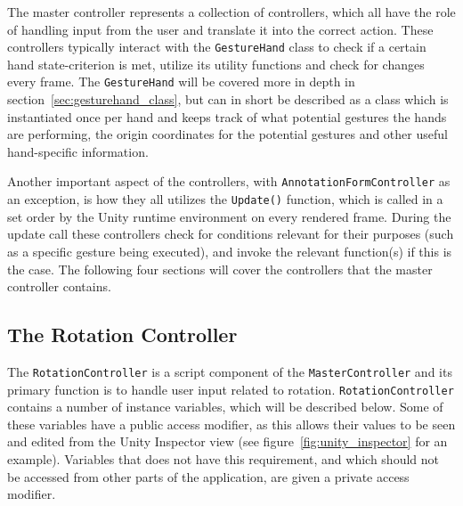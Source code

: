 The master controller represents a collection of controllers, which all have the role of handling input from the user and translate it into
the correct action. These controllers typically interact with the \texttt{GestureHand} class to check if a certain hand state-criterion
is met, utilize its utility functions and check for changes every frame. The \texttt{GestureHand} will be covered more in depth in section~\vref{sec:gesturehand_class}, 
but can in short be described as a class which is instantiated once per hand and keeps track of what potential gestures the hands are performing, the origin coordinates
for the potential gestures and other useful hand-specific information. 

Another important aspect of the controllers, with \texttt{Annotation\-Form\-Controller} as an exception, is how they all utilizes the \texttt{Update()} function, 
which is called in a set order by the Unity runtime environment on every rendered frame. 
During the update call these controllers check for conditions relevant for their purposes (such as a specific gesture being executed), 
and invoke the relevant function(s) if this is the case. 
The following four sections will cover the controllers that the master controller contains.

\subsection{The Rotation Controller}
The \texttt{RotationController} is a script component of the \texttt{MasterController} and its primary function is to handle user input related to rotation.
\texttt{RotationController} contains a number of instance variables, which will be described below. Some of these variables have a public access modifier, as
this allows their values to be seen and edited from the Unity Inspector view (see figure~\vref{fig:unity_inspector} for an example). Variables that does not
have this requirement, and which should not be accessed from other parts of the application, are given a private access modifier.

